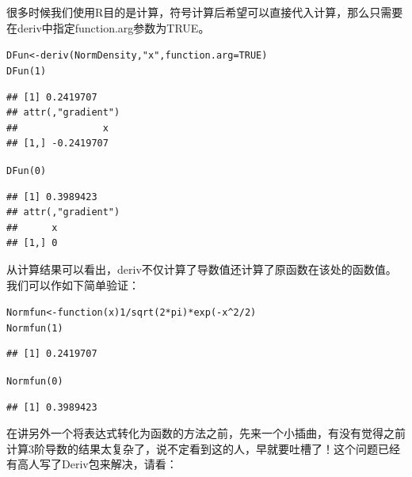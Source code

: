 \documentclass[a4paper]{ctexart}\usepackage[]{graphicx}\usepackage[]{color}
\makeatletter
\newcommand{\hlnum}[1]{\textcolor[rgb]{0.502,0.086,1}{#1}}%
\newcommand{\hlstr}[1]{\textcolor[rgb]{1,0.4,0.2}{#1}}%
\newcommand{\hlopt}[1]{\textcolor[rgb]{0.251,0.251,0.251}{#1}}%
\newcommand{\hlstd}[1]{\textcolor[rgb]{0.251,0.251,0.251}{#1}}%
\newcommand{\hlkwa}[1]{\textcolor[rgb]{0.941,0.188,0.816}{#1}}%
\newcommand{\hlkwb}[1]{\textcolor[rgb]{0,0.439,0.902}{#1}}%
\newcommand{\hlkwc}[1]{\textcolor[rgb]{0.188,0.941,0.314}{#1}}%
\newcommand{\hlkwd}[1]{\textcolor[rgb]{0.69,0.188,0.941}{#1}}%
\newenvironment{kframe}{%
 \def\at@end@of@kframe{}%
 \ifinner\ifhmode%
  \def\at@end@of@kframe{\end{minipage}}%
  \begin{minipage}{\columnwidth}%
 \fi\fi%
 \def\FrameCommand##1{\hskip\@totalleftmargin \hskip-\fboxsep
 \colorbox{shadecolor}{##1}\hskip-\fboxsep
     \hskip-\linewidth \hskip-\@totalleftmargin \hskip\columnwidth}%
 \MakeFramed {\advance\hsize-\width
   \@totalleftmargin\z@ \linewidth\hsize
   \@setminipage}}%
 {\par\unskip\endMakeFramed%
 \at@end@of@kframe}
\newenvironment{knitrout}{}{} %
\makeatother
\begin{document}
很多时候我们使用R目的是计算，符号计算后希望可以直接代入计算，那么只需要在deriv中指定function.arg参数为TRUE。
\begin{knitrout}
\color{fgcolor}\begin{kframe}
\begin{alltt}
\hlstd{DFun} \hlkwb{<-} \hlkwd{deriv}\hlstd{(NormDensity,} \hlstr{"x"}\hlstd{,} \hlkwc{function.arg} \hlstd{=} \hlnum{TRUE}\hlstd{)}
\hlkwd{DFun}\hlstd{(}\hlnum{1}\hlstd{)}
\end{alltt}
\begin{verbatim}
## [1] 0.2419707
## attr(,"gradient")
##               x
## [1,] -0.2419707
\end{verbatim}
\begin{alltt}
\hlkwd{DFun}\hlstd{(}\hlnum{0}\hlstd{)}
\end{alltt}
\begin{verbatim}
## [1] 0.3989423
## attr(,"gradient")
##      x
## [1,] 0
\end{verbatim}
\end{kframe}
\end{knitrout}
从计算结果可以看出，deriv不仅计算了导数值还计算了原函数在该处的函数值。我们可以作如下简单验证：
\begin{knitrout}
\color{fgcolor}\begin{kframe}
\begin{alltt}
\hlstd{Normfun} \hlkwb{<-} \hlkwa{function}\hlstd{(}\hlkwc{x}\hlstd{)} \hlnum{1}\hlopt{/}\hlkwd{sqrt}\hlstd{(}\hlnum{2} \hlopt{*} \hlstd{pi)} \hlopt{*} \hlkwd{exp}\hlstd{(}\hlopt{-}\hlstd{x}\hlopt{^}\hlnum{2}\hlopt{/}\hlnum{2}\hlstd{)}
\hlkwd{Normfun}\hlstd{(}\hlnum{1}\hlstd{)}
\end{alltt}
\begin{verbatim}
## [1] 0.2419707
\end{verbatim}
\begin{alltt}
\hlkwd{Normfun}\hlstd{(}\hlnum{0}\hlstd{)}
\end{alltt}
\begin{verbatim}
## [1] 0.3989423
\end{verbatim}
\end{kframe}
\end{knitrout}
在讲另外一个将表达式转化为函数的方法之前，先来一个小插曲，有没有觉得之前计算3阶导数的结果太复杂了，说不定看到这的人，早就要吐槽了！这个问题已经有高人写了Deriv包\cite{R-Deriv}来解决，请看：
\end{document}
